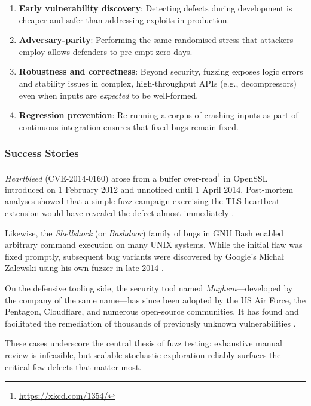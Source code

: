 \documentclass[
  a4paper,
  DIV=11,
  numbers=noendperiod]{scrreprt}
\providecommand{\tightlist}{%
  \setlength{\itemsep}{0pt}\setlength{\parskip}{0pt}}
\theoremstyle{definition}
\theoremstyle{remark}
\begin{document}
\begin{enumerate}
\def\labelenumi{\arabic{enumi}.}
\tightlist
\item
  \textbf{Early vulnerability discovery}: Detecting defects during
  development is cheaper and safer than addressing exploits in
  production.
\item
  \textbf{Adversary-parity}: Performing the same randomised stress that
  attackers employ allows defenders to pre-empt zero-days.
\item
  \textbf{Robustness and correctness}: Beyond security, fuzzing exposes
  logic errors and stability issues in complex, high-throughput APIs
  (e.g., decompressors) even when inputs are \emph{expected} to be
  well-formed.
\item
  \textbf{Regression prevention}: Re-running a corpus of crashing inputs
  as part of continuous integration ensures that fixed bugs remain
  fixed.
\end{enumerate}

\subsubsection{Success Stories}\label{success-stories}

\emph{Heartbleed} (CVE-2014-0160) \autocite{heartbleed,heartbleed-cve}
arose from a buffer over-read\footnote{\url{https://xkcd.com/1354/}} in
OpenSSL \autocite{theopensslproject2025} introduced on 1 February 2012
and unnoticed until 1 April 2014. Post-mortem analyses showed that a
simple fuzz campaign exercising the TLS heartbeat extension would have
revealed the defect almost immediately \autocite{wheeler2014}.

Likewise, the \emph{Shellshock} (or \emph{Bashdoor}) family of bugs in
GNU Bash \autocite{bash} enabled arbitrary command execution on many
UNIX systems. While the initial flaw was fixed promptly, subsequent bug
variants were discovered by Google's Michał Zalewski using his own
fuzzer \autocite{afl} in late 2014 \autocite{saarinen2014}.

On the defensive tooling side, the security tool named
\emph{Mayhem}---developed by the company of the same name---has since
been adopted by the US Air Force, the Pentagon, Cloudflare, and numerous
open-source communities. It has found and facilitated the remediation of
thousands of previously unknown vulnerabilities
\autocite{simonite2020mayhem}.

These cases underscore the central thesis of fuzz testing: exhaustive
manual review is infeasible, but scalable stochastic exploration
reliably surfaces the critical few defects that matter most.
\end{document}
